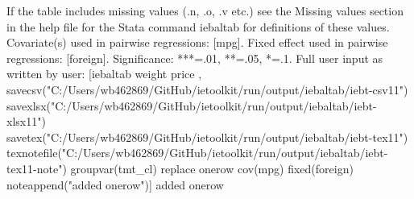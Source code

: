 If the table includes missing values (.n, .o, .v etc.) see the Missing values section in the help file for the Stata command iebaltab for definitions of these values. Covariate(s) used in pairwise regressions: [mpg]. Fixed effect used in pairwise regressions: [foreign]. Significance: ***=.01, **=.05, *=.1. Full user input as written by user: [iebaltab weight price , savecsv("C:/Users/wb462869/GitHub/ietoolkit/run/output/iebaltab/iebt-csv11") savexlsx("C:/Users/wb462869/GitHub/ietoolkit/run/output/iebaltab/iebt-xlsx11") savetex("C:/Users/wb462869/GitHub/ietoolkit/run/output/iebaltab/iebt-tex11") texnotefile("C:/Users/wb462869/GitHub/ietoolkit/run/output/iebaltab/iebt-tex11-note") groupvar(tmt\_cl) replace onerow cov(mpg) fixed(foreign) noteappend("added onerow")] added onerow
